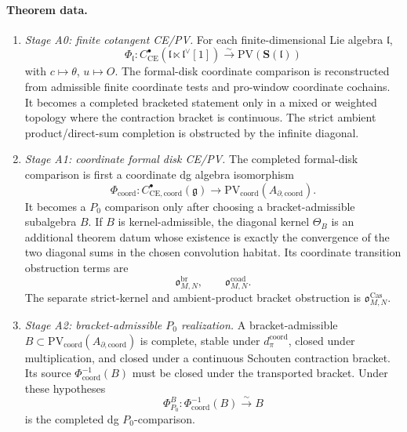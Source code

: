 \medskip
\paragraph{Theorem data.}

\begin{enumerate}
  \item \emph{Stage A0: finite cotangent CE/PV.}
  For each finite-dimensional Lie algebra \(\mathfrak l\),
  \[
    \Phi_{\mathfrak l}\colon
    C^\bullet_{\mathrm{CE}}
      (\mathfrak l\ltimes \mathfrak l^\vee[1])
    \xrightarrow{\sim}
    \mathrm{PV}(\mathbf S(\mathfrak l))
  \]
  with \(c\mapsto\theta\), \(u\mapsto O\).  The formal-disk coordinate
  comparison is reconstructed from admissible finite coordinate tests and
  pro-window coordinate cochains.  It becomes a completed bracketed
  statement only in a mixed or weighted topology where the contraction
  bracket is continuous.  The strict ambient product/direct-sum
  completion is obstructed by the infinite diagonal.

  \item \emph{Stage A1: coordinate formal disk CE/PV.}
  The completed formal-disk comparison is first a coordinate dg algebra
  isomorphism
  \[
    \Phi_{\mathrm{coord}}\colon
    C^\bullet_{\mathrm{CE},\mathrm{coord}}(\mathfrak g)
    \longrightarrow
    \mathrm{PV}_{\mathrm{coord}}(A_{\partial,\mathrm{coord}}).
  \]
  It becomes a \(P_0\) comparison only after choosing a
  bracket-admissible subalgebra \(B\).  If \(B\) is kernel-admissible, the
  diagonal kernel \(\Theta_B\) is an additional theorem datum whose
  existence is exactly the convergence of the two diagonal sums in the
  chosen convolution habitat.
  Its coordinate transition obstruction terms are
  \[
    \mathfrak o^{\mathrm{br}}_{M,N},\qquad
    \mathfrak o^{\mathrm{coad}}_{M,N}.
	  \]
	  The separate strict-kernel and ambient-product bracket obstruction is
	  \(\mathfrak o^{\mathrm{Cas}}_{M,N}\).

  \item \emph{Stage A2: bracket-admissible \(P_0\) realization.}
  A bracket-admissible \(B\subset
  \mathrm{PV}_{\mathrm{coord}}(A_{\partial,\mathrm{coord}})\) is complete,
  stable under \(d_\pi^{\mathrm{coord}}\), closed under multiplication, and closed under a
  continuous Schouten contraction bracket.  Its source
  \(\Phi_{\mathrm{coord}}^{-1}(B)\) must be closed under the transported
  bracket.  Under these hypotheses
  \[
    \Phi^B_{P_0}\colon\Phi_{\mathrm{coord}}^{-1}(B)
    \xrightarrow{\sim}B
  \]
  is the completed dg \(P_0\)-comparison.


\end{enumerate}
